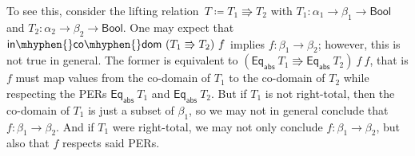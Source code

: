 \documentclass{article}
\newcommand{\kevin}[1]{\textcolor{violet}{\textbf{Kevin}: #1}}
\theoremstyle{definition}
\newcommand{\incodom}{\mathsf{in\mhyphen{}co\mhyphen{}dom}}
\newcommand{\bool}{\mathsf{Bool}}
\newcommand{\eqabs}{\mathsf{Eq_{abs}}}
\newcommand{\liftrel}{lifting relation\xspace}
\newcommand{\liftrels}{lifting relations\xspace}
\begin{document}
To see this,
consider the \liftrel\ \(T \coloneqq T_1 \Rrightarrow T_2\) with \(T_1 : \alpha_1 \rightarrow \beta_1\rightarrow \bool\) and \(T_2 : \alpha_2 \rightarrow \beta_2\rightarrow\bool\).
One may expect that \(\incodom\ (T_1 \Rrightarrow T_2)\ f\) implies $f : \beta_1\to\beta_2$;
however, this is not true in general.
The former is equivalent to \((\eqabs\ T_1 \Rrightarrow \eqabs\ T_2)\ f\ f\),
that is \(f\) must map values from the co-domain of \(T_1\) to the co-domain of \(T_2\)
while respecting the PERs \(\eqabs\ T_1\) and \(\eqabs\ T_2\).
But if $T_1$ is not right-total, then the co-domain of $T_1$ is just a subset of $\beta_1$,
so we may not in general conclude that $f : \beta_1\to\beta_2$.
And if $T_1$ were right-total,
we may not only conclude $f : \beta_1\to\beta_2$,
but also that $f$ respects said PERs.

\end{document}
